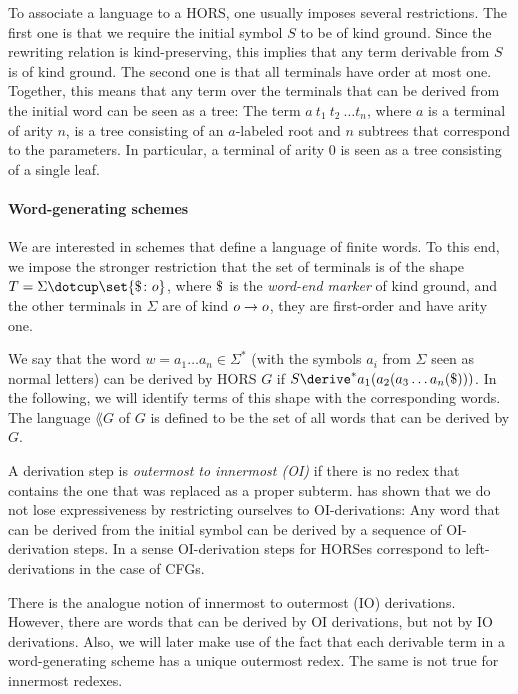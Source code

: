 \documentclass[../../diss.tex]{subfiles}
\begin{document}
To associate a language to a HORS, one usually imposes several restrictions.
The first one is that we require the initial symbol $S$ to be of kind ground.
Since the rewriting relation is kind-preserving, this implies that any term derivable from $S$ is of kind ground.
The second one is that all terminals have order at most one.
Together, this means that any term over the terminals that can be derived from the initial word can be seen as a tree:
The term $a\ t_1\ t_2\ \ldots t_n$, where $a$ is a terminal of arity $n$, is a tree consisting of an $a$-labeled root and $n$ subtrees that correspond to the parameters.
In particular, a terminal of arity $0$ is seen as a tree consisting of a single leaf.

\paragraph{Word-generating schemes}

We are interested in schemes that define a language of finite words.
To this end, we impose the stronger restriction that the set of terminals is of the shape $T = \Sigma \dotcup \set{ \wordend \colon \ground}$, where $\wordend$ is the \emph{word-end marker} of kind ground, and the other terminals in $\Sigma$ are of kind $o \to o$, \ie they are first-order and have arity one.

We say that the word $w = a_1 \ldots a_n \in \Sigma^*$ (with the symbols $a_i$ from $\Sigma$ seen as normal letters) can be derived by HORS $G$ if $S \derive^* a_1 (a_2 ( a_3 \ldots a_n(\wordend)))$.
In the following, we will identify terms of this shape with the corresponding words.
The language $\lang{G}$ of $G$ is defined to be the set of all words that can be derived by $G$.

A derivation step is \emph{outermost to innermost (OI)} if there is no redex that contains the one that was replaced as a proper subterm.
 has shown that we do not lose expressiveness by restricting ourselves to OI-derivations:
Any word that can be derived from the initial symbol can be derived by a sequence of OI-derivation steps.
In a sense OI-derivation steps for HORSes correspond to left-derivations in the case of CFGs.

There is the analogue notion of innermost to outermost (IO) derivations.
However, there are words that can be derived by OI derivations, but not by IO derivations.
Also, we will later make use of the fact that each derivable term in a word-generating scheme has a unique outermost redex.
The same is not true for innermost redexes.
\end{document}
